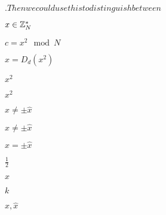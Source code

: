 \documentclass[10pt]{book}
\begin{document}
\begin{mdSnippets}
\begin{mdInlineSnippet}
$. Then we could use this to distinguish between $\end{mdInlineSnippet}%
\begin{mdInlineSnippet}%
$x \in \mathbb{Z}_N^*$\end{mdInlineSnippet}%
\begin{mdInlineSnippet}[15332b4bb399db4933630cc0f7e79959]%
$c = x^2 \mod N$\end{mdInlineSnippet}%
\begin{mdInlineSnippet}[e1a078bc74e976a674204a0c6ce116d8]%
$\hat{x} = D_d(x^2)$\end{mdInlineSnippet}%
\begin{mdInlineSnippet}%
$x^2$\end{mdInlineSnippet}%
\begin{mdInlineSnippet}%
$x^2$\end{mdInlineSnippet}%
\begin{mdInlineSnippet}[0c99a2a7978d591148a2b9e5cc1d9e28]%
$x \neq \pm \hat{x}$\end{mdInlineSnippet}%
\begin{mdInlineSnippet}[0c99a2a7978d591148a2b9e5cc1d9e28]%
$x \neq \pm \hat{x}$\end{mdInlineSnippet}%
\begin{mdInlineSnippet}[4b4c50fe103d5c99d883bc1eaefa227f]%
$x = \pm\hat{x}$\end{mdInlineSnippet}%
\begin{mdInlineSnippet}[93b05c90d14a117ba52da1d743a43ab1]%
$\frac{1}{2}$\end{mdInlineSnippet}%
\begin{mdInlineSnippet}[9dd4e461268c8034f5c8564e155c67a6]%
$x$\end{mdInlineSnippet}%
\begin{mdInlineSnippet}[8ce4b16b22b58894aa86c421e8759df3]%
$k$\end{mdInlineSnippet}%
\begin{mdInlineSnippet}[58010065c5914ea8e1d02ea076ceccb4]%
$x,\hat{x}$\end{mdInlineSnippet}%
\begin{mdInlineSnippet}[3d9ae6d78cecffb391ef7928094b8d97]%

\end{mdInlineSnippet}
\end{mdSnippets}
\end{document}
